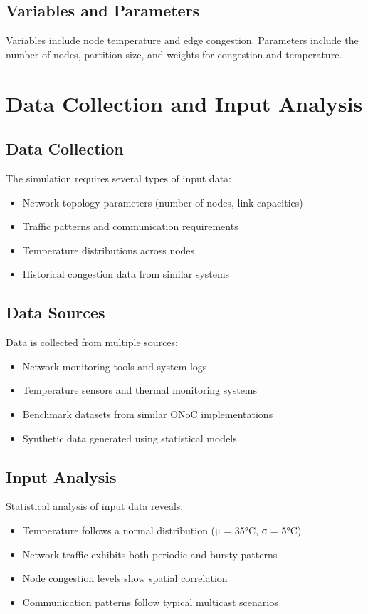 \documentclass[12pt]{article}
\begin{document}
\subsection{Variables and Parameters}
Variables include node temperature and edge congestion. Parameters include the number of nodes, partition size, and weights for congestion and temperature.

\section{Data Collection and Input Analysis}
\subsection{Data Collection}
The simulation requires several types of input data:
\begin{itemize}
    \item Network topology parameters (number of nodes, link capacities)
    \item Traffic patterns and communication requirements
    \item Temperature distributions across nodes
    \item Historical congestion data from similar systems
\end{itemize}

\subsection{Data Sources}
Data is collected from multiple sources:
\begin{itemize}
    \item Network monitoring tools and system logs
    \item Temperature sensors and thermal monitoring systems
    \item Benchmark datasets from similar ONoC implementations
    \item Synthetic data generated using statistical models
\end{itemize}

\subsection{Input Analysis}
Statistical analysis of input data reveals:
\begin{itemize}
    \item Temperature follows a normal distribution (μ = 35°C, σ = 5°C)
    \item Network traffic exhibits both periodic and bursty patterns
    \item Node congestion levels show spatial correlation
    \item Communication patterns follow typical multicast scenarios
\end{itemize}
\end{document}
